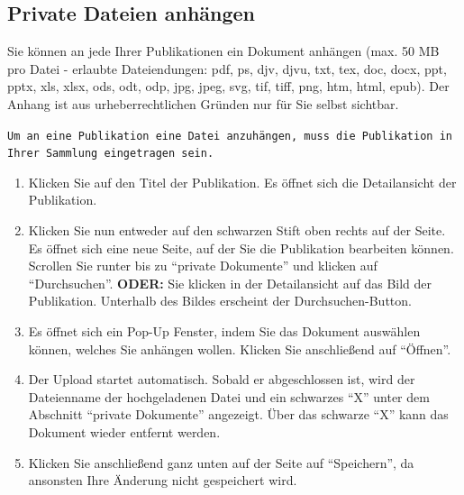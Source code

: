 \begin{description}
\subsection{Private Dateien anhängen}
Sie können an jede Ihrer Publikationen ein Dokument anhängen (max. 50 MB pro Datei - erlaubte Dateiendungen: pdf, ps, djv, djvu, txt, tex, doc, docx, ppt, pptx, xls, xlsx, ods, odt, odp, jpg, jpeg, svg, tif, tiff, png, htm, html, epub). Der Anhang ist aus urheberrechtlichen Gründen nur für Sie selbst sichtbar.

\begin{mdframed}[style=mdfexample1,frametitle={\texttt{BEDINGUNG}},backgroundcolor=gray!40]\texttt{Um an eine Publikation eine Datei anzuhängen, muss die Publikation in Ihrer Sammlung eingetragen sein.}\end{mdframed}
\begin{enumerate}
    \item Klicken Sie auf den Titel der Publikation. Es öffnet sich die Detailansicht der Publikation.
    \item Klicken Sie nun entweder auf den schwarzen Stift oben rechts auf der Seite. Es öffnet sich eine neue Seite, auf der Sie die Publikation bearbeiten können. Scrollen Sie runter bis zu \enquote{private Dokumente} und klicken auf \enquote{Durchsuchen}. \newline \textbf{ODER:} Sie klicken in der Detailansicht auf das Bild der Publikation. Unterhalb des Bildes erscheint der Durchsuchen-Button. 
    \item Es öffnet sich ein Pop-Up Fenster, indem Sie das Dokument auswählen können, welches Sie anhängen wollen. Klicken Sie anschließend auf \enquote{Öffnen}.
    \item Der Upload startet automatisch. Sobald er abgeschlossen ist, wird der Dateienname der hochgeladenen Datei und ein schwarzes \enquote{X} unter dem Abschnitt \enquote{private Dokumente} angezeigt. Über das schwarze \enquote{X} kann das Dokument wieder entfernt werden.
    \item Klicken Sie anschließend ganz unten auf der Seite auf \enquote{Speichern}, da ansonsten Ihre Änderung nicht gespeichert wird.
\end{enumerate}
\begin{figure}[h!]
 \centering

\end{figure}
\end{description}
